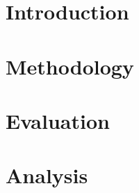 \documentclass{sig-alternate-05-2015}
\begin{document}
%

%
%
%
%



\section{Introduction}
\label{section:intro}


\section{Methodology}
\label{section:method}


\section{Evaluation}
\label{section:eval}


\section{Analysis}
\label{section:analysis}

\end{document}
